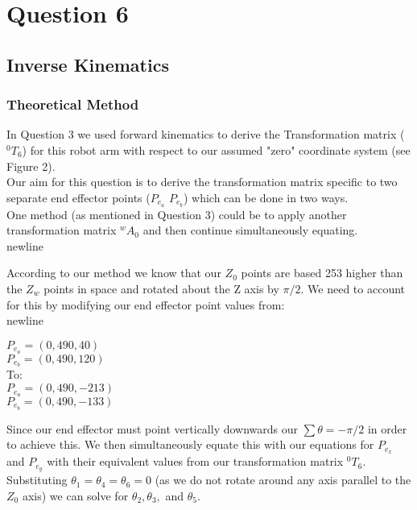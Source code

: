 \newpage
\section{Question 6}
	\subsection{Inverse Kinematics}
	\subsubsection{Theoretical Method}
	In Question 3 we used forward kinematics to derive the Transformation matrix ($^{0}T_{6}$) for this robot arm with respect to our assumed "zero" coordinate system (see Figure 2).\\\newline\vspace{3mm}
	Our aim for this question is to derive the transformation matrix specific to two separate end effector points ($P_{e_{a}}$ $P_{e_{b}}$) which can be done in two ways.\\\newline\vspace{3mm}
	One method (as mentioned in Question 3) could be to apply another transformation matrix $^{w}A_{0}$ and then continue simultaneously equating.\\newline\vspace{3mm}
	
	According to our method we know that our $Z_{0}$ points are based 253 higher than the $Z_{w}$ points in space and rotated about the Z axis by $\pi/2$. We need to account for this by modifying our end effector point values from:\\newline\vspace{3mm}
	
	$P_{e_{a}} = (0, 490, 40)$\\
	$P_{e_{b}} = (0, 490, 120)$\\
	\vspace{newline}
	To:\\
	$P_{e_{a}} = (0, 490, -213)$\\
	$P_{e_{b}} = (0, 490, -133)$
	
	Since our end effector must point vertically downwards our $\sum\theta = -\pi/2$ in order to achieve this. We then simultaneously equate this with our equations for $P_{e_{x}}$ and $P_{e_{y}}$ with their equivalent values from our transformation matrix $^{0}T_{6}$. Substituting $\theta_{1} = \theta_{4} = \theta_{6} = 0$ (as we do not rotate around any axis parallel to the $Z_{0}$ axis) we can solve for $\theta_{2}, \theta_{3}, $ and $\theta_{5}$.
	
